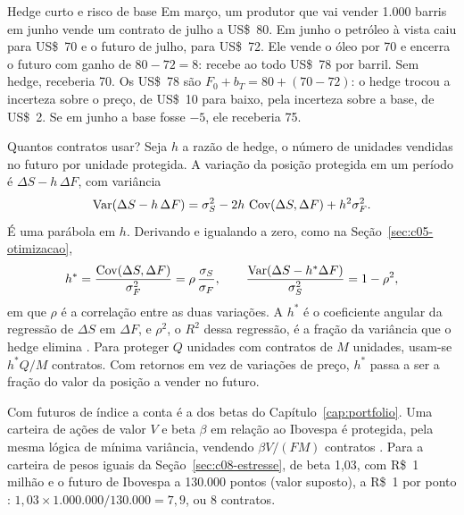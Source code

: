 \begin{exemplo}{Hedge curto e risco de base}
Em março, um produtor que vai vender 1.000 barris em junho vende um contrato de julho a US\$~80. Em junho o petróleo à vista caiu para US\$~70 e o futuro de julho, para US\$~72. Ele vende o óleo por 70 e encerra o futuro com ganho de $80 - 72 = 8$: recebe ao todo US\$~78 por barril. Sem hedge, receberia 70. Os US\$~78 são $F_0 + b_T = 80 + (70 - 72)$: o hedge trocou a incerteza sobre o preço, de US\$~10 para baixo, pela incerteza sobre a base, de US\$~2. Se em junho a base fosse $-5$, ele receberia 75.
\end{exemplo}


Quantos contratos usar? Seja $h$ a razão de hedge, o número de unidades vendidas no futuro por unidade protegida. A variação da posição protegida em um período é $\Delta S - h\,\Delta F$, com variância
\begin{equation}
  \operatorname{Var}(\Delta S - h\,\Delta F) = \sigma_S^2 - 2h\,\operatorname{Cov}(\Delta S, \Delta F) + h^2 \sigma_F^2 .
\end{equation}
É uma parábola em $h$. Derivando e igualando a zero, como na Seção~\ref{sec:c05-otimizacao},
\begin{equation}
  h^{\ast} = \frac{\operatorname{Cov}(\Delta S, \Delta F)}{\sigma_F^2} = \rho\,\frac{\sigma_S}{\sigma_F} ,
  \qquad
  \frac{\operatorname{Var}(\Delta S - h^{\ast}\Delta F)}{\sigma_S^2} = 1 - \rho^2 ,
  \label{eq:c09-hedge}
\end{equation}
em que $\rho$ é a correlação entre as duas variações. A  $h^{\ast}$ é o coeficiente angular da regressão de $\Delta S$ em $\Delta F$, e $\rho^2$, o $R^2$ dessa regressão, é a fração da variância que o hedge elimina \citep{johnson1960, ederington1979}. Para proteger $Q$ unidades com contratos de $M$ unidades, usam-se $h^{\ast} Q / M$ contratos. Com retornos em vez de variações de preço, $h^{\ast}$ passa a ser a fração do valor da posição a vender no futuro.

Com futuros de índice a conta é a dos betas do Capítulo~\ref{cap:portfolio}. Uma carteira de ações de valor $V$ e beta $\beta$ em relação ao Ibovespa é protegida, pela mesma lógica de mínima variância, vendendo $\beta V / (F M)$ contratos \citep[cap.~3]{hull2022}. Para a carteira de pesos iguais da Seção~\ref{sec:c08-estresse}, de beta 1,03, com R\$~1 milhão e o futuro de Ibovespa a 130.000 pontos (valor suposto), a R\$~1 por ponto \citep{b3ind}: $1,03 \times 1.000.000/130.000 = 7,9$, ou 8 contratos.


